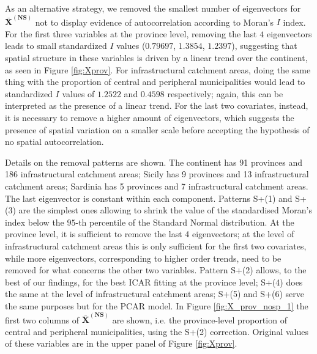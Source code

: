 \documentclass{book}
\begin{document}
As an alternative strategy, we removed the smallest number of eigenvectors for $\mathbf{\bar{X}^{(NS)}}$ not to display evidence of autocorrelation according to Moran's $I$ index. %
For the first three variables at the province level, removing the last $4$ eigenvectors leads to small standardized $I$ values ($0.79697$, $1.3854$, $1.2397$), suggesting that spatial structure in these variables is driven by a linear trend over the continent, as seen in Figure \ref{fig:Xprov}. For infrastructural catchment areas, doing the same thing with the proportion of central and peripheral municipalities would lead to standardized $I$ values of $1.2522$ and $0.4598$ respectively; again, this can be interpreted as the presence of a linear trend. For the last two covariates, instead, it is necessary to remove a higher amount of eigenvectors, which suggests the presence of spatial variation on a smaller scale before accepting the hypothesis of no spatial autocorrelation.

Details on the removal patterns are shown. The continent has 91 provinces and 186 infrastructural catchment areas; Sicily has 9 provinces and 13 infrastructural catchment areas; Sardinia has 5 provinces and 7 infrastructural catchment areas. The last eigenvector is constant within each component.
Patterns S+(1) and S+(3) are the simplest ones allowing to shrink the value of the standardised Moran's index below the $95$-th percentile of the Standard Normal distribution. At the province level, it is sufficient to remove the last 4 eigenvectors; at the level of infrastructural catchment areas this is only sufficient for the first two covariates, while more eigenvectors, corresponding to higher order trends, need to be removed for what concerns the other two variables. Pattern S+(2) allows, to the best of our findings, for the best ICAR fitting at the province level; S+(4) does the same at the level of infrastructural catchment areas; S+(5) and S+(6) serve the same purposes but for the PCAR model. In Figure \ref{fig:X_prov_nosp_1} the first two columns of $\mathbf{\bar{X}^{(NS)}}$ are shown, i.e. the province-level proportion of central and peripheral municipalities, using the S+(2) correction. Original values of these variables are in the upper panel of Figure \ref{fig:Xprov}.
\end{document}
